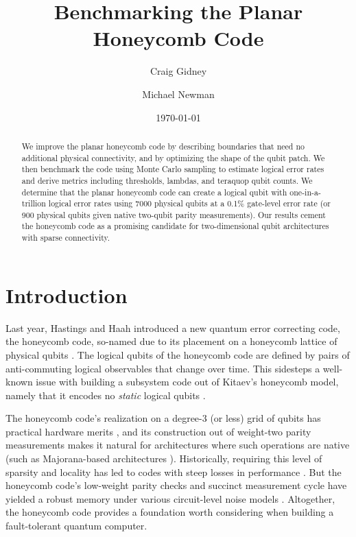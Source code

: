 \documentclass[onecolumn,unpublished,a4paper]{quantumarticle}
\theoremstyle{definition}
\theoremstyle{definition}
\theoremstyle{definition}
\begin{document}
\title{Benchmarking the Planar Honeycomb Code}

\date{\today}
\author{Craig Gidney}

\author{Michael Newman}

\begin{abstract}
We improve the planar honeycomb code by describing boundaries that need no additional physical connectivity, and by optimizing the shape of the qubit patch.
We then benchmark the code using Monte Carlo sampling to estimate logical error rates and derive metrics including thresholds, lambdas, and teraquop qubit counts.
We determine that the planar honeycomb code can create a logical qubit with one-in-a-trillion logical error rates using 7000 physical qubits at a 0.1\% gate-level error rate (or 900 physical qubits given native two-qubit parity measurements).
Our results cement the honeycomb code as a promising candidate for two-dimensional qubit architectures with sparse connectivity.
\end{abstract}

\maketitle

\section{Introduction}
\label{sec:introduction}

Last year, Hastings and Haah introduced a new quantum error correcting code, the honeycomb code, so-named due to its placement on a honeycomb lattice of physical qubits \cite{hastings2021dynamically}.
The logical qubits of the honeycomb code are defined by pairs of anti-commuting logical observables that change over time.  
This sidesteps a well-known issue with building a subsystem code out of Kitaev's honeycomb model, namely that it encodes no \emph{static} logical qubits \cite{kitaev2006anyons, suchara2011constructions, lee2017topological, wootton2021hexagonal}.

The honeycomb code's realization on a degree-3 (or less) grid of qubits has practical hardware merits \cite{chamberland2020topological}, and its construction out of weight-two parity measurements makes it natural for architectures where such operations are native (such as Majorana-based architectures \cite{chao2020optimization}).  
Historically, requiring this level of sparsity and locality has led to codes with steep losses in performance \cite{bacon2006operator, suchara2011constructions}.
But the honeycomb code's low-weight parity checks and succinct measurement cycle have yielded a robust memory under various circuit-level noise models \cite{gidney2021honeycombmemory}.
Altogether, the honeycomb code provides a foundation worth considering when building a fault-tolerant quantum computer.
\end{document}
